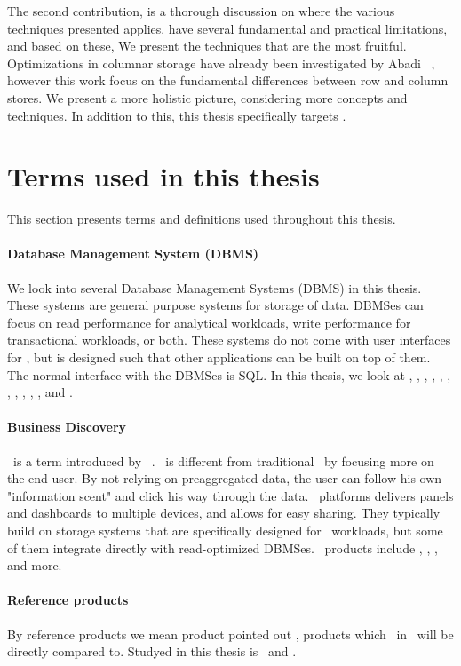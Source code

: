 The second contribution, is a thorough discussion on where the various techniques presented applies. \genusSoftware have several fundamental and practical limitations, and based on these, We present the techniques that are the most fruitful. Optimizations in columnar storage have already been investigated by Abadi \ea~\cite{Abadi2008-dd}, however this work focus on the fundamental differences between row and column stores. We present a more holistic picture, considering more concepts and techniques. In addition to this, this thesis specifically targets \genusSoftware.

\section{Terms used in this thesis}
\label{sec:Terms used in this thesis}
This section presents terms and definitions used throughout this thesis.

\paragraph{Database Management System (DBMS)}
\label{par:Database Management System (DBMS)}
We look into several Database Management Systems (DBMS) in this thesis. These systems are general purpose systems for storage of data. DBMSes can focus on read performance for analytical workloads, write performance for transactional workloads, or both. These systems do not come with user interfaces for \bd, but is designed such that other applications can be built on top of them. The normal interface with the DBMSes is SQL. In this thesis, we look at \oracle, \ibm, \saph, \sapnw, \mssql, \cstore, \vertica, \blink, \exasol, \oracle, \hyper, and \hyrise.

\paragraph{Business Discovery}
\label{par:Business Discovery}
\bd~is a term introduced by \qlikview~\cite{Qlik2014-vd}. \bd~is different from traditional \bi~by focusing more on the end user. By not relying on preaggregated data, the user can follow his own "information scent" and click his way through the data. \bd~platforms delivers panels and dashboards to multiple devices, and allows for easy sharing. They typically build on storage systems that are specifically designed for \bd~workloads, but some of them integrate directly with read-optimized DBMSes. \bd~products include \tableau, \qlikview, \powerpivot, and more.

\paragraph{Reference products}
\label{par:Reference products}
By reference products we mean product pointed out \genus, products which \bd~in \genusSoftware~will be directly compared to. Studyed in this thesis is \qlikview~and \tableau.






